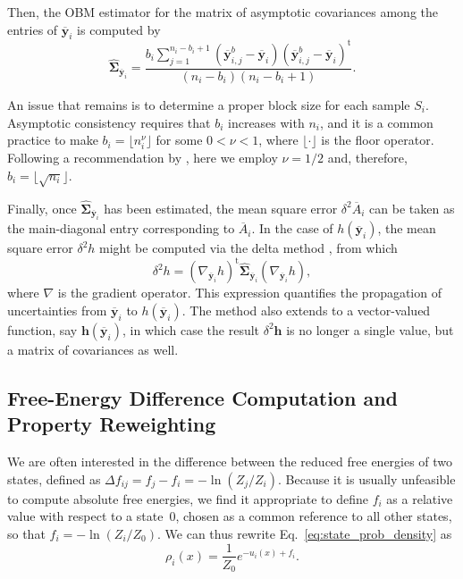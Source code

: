 \documentclass[journal=jctcce,manuscript=article,layout=twocolumn]{achemso}
\newcommand{\mt}[1]{\boldsymbol{\mathbf{#1}}}   %
\newcommand{\vt}[1]{\boldsymbol{\mathbf{#1}}}   %
\newcommand{\tr}[1]{#1^\text{t}}                %
\begin{document}
Then, the OBM estimator for the matrix of asymptotic covariances among the entries of $\overline{\vt y}_i$ is computed by \cite{Meketon_1984}
\begin{equation}
\label{eq:obm asymptotic covariance}
\hat{\mt \Sigma}_{\overline{\vt y}_i} = \frac{b_i \sum\limits_{j=1}^{n_i - b_i + 1} ({\overline{\vt y}}^b_{i,j} - \overline{\vt y}_i) \tr{({\overline{\vt y}}^b_{i,j} - \overline{\vt y}_i)}}{(n_i - b_i)(n_i - b_i + 1)}.
\end{equation}

An issue that remains is to determine a proper block size for each sample $S_i$. Asymptotic consistency requires that $b_i$ increases with $n_i$, and it is a common practice to make $b_i = \lfloor n_i^\nu \rfloor$ for some $0 < \nu < 1$, where $\lfloor \cdot \rfloor$ is the floor operator. Following a recommendation by \citeauthor{Flegal_2010} \cite{Flegal_2010}, here we employ $\nu = 1/2$ and, therefore, $b_i = \lfloor \sqrt{n_i} \rfloor$.

Finally, once $\hat{\mt \Sigma}_{\overline{\vt y}_i}$ has been estimated, the mean square error $\delta^2 \overline A_i$ can be taken as the main-diagonal entry corresponding to $\overline A_i$. In the case of $h(\overline{\vt y}_i)$, the mean square error $\delta^2 h$ might be computed via the delta method \cite{Greene_2012}, from which
\begin{equation}
\label{eq:delta method}
\delta^2 h = \tr{(\nabla_{\overline{\vt y}_i} h)} \hat{\mt \Sigma}_{\overline{\vt y}_i}(\nabla_{\overline{\vt y}_i} h),
\end{equation} 
where $\nabla$ is the gradient operator. This expression quantifies the propagation of uncertainties from $\overline{\vt y}_i$ to $h(\overline{\vt y}_i)$. The method also extends to a vector-valued function, say $\vt h(\overline{\vt y}_i)$, in which case the result $\delta^2 \vt h$ is no longer a single value, but a matrix of covariances as well.

\subsection{Free-Energy Difference Computation and Property Reweighting}
\label{sec:fep and reweighting}

We are often interested in the difference between the reduced free energies of two states, defined as $\Delta f_{ij} = f_j - f_i = - \ln (Z_j/Z_i)$. Because it is usually unfeasible to compute absolute free energies, we find it appropriate to define $f_i$ as a relative value with respect to a state~$0$, chosen as a common reference to all other states, so that $f_i = -\ln (Z_i/Z_0)$. We can thus rewrite Eq.~\eqref{eq:state_prob_density} as
\begin{equation}
\label{eq:state_prob_density_Z0}
\rho_i(x) = \frac{1}{Z_0} e^{-u_i(x)+ f_i}.
\end{equation}
\end{document}
